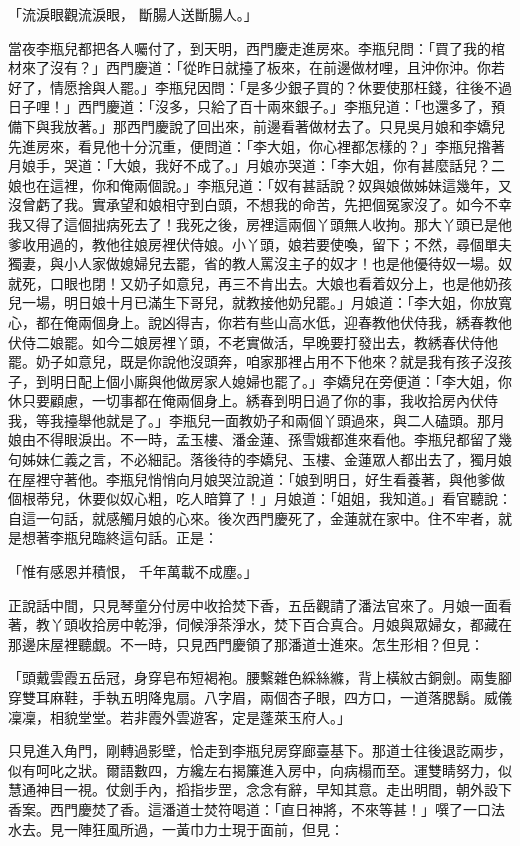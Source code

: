 \begin{showcontents}{}
「流淚眼觀流淚眼，  斷腸人送斷腸人。」

當夜李瓶兒都把各人囑付了，到天明，西門慶走進房來。李瓶兒問：「買了我的棺材來了沒有？」西門慶道：「從昨日就擡了板來，在前邊做材哩，且沖你沖。你若好了，情愿捨與人罷。」李瓶兒因問：「是多少銀子買的？休要使那枉錢，往後不過日子哩！」西門慶道：「沒多，只給了百十兩來銀子。」李瓶兒道：「也還多了，預備下與我放著。」那西門慶說了回出來，前邊看著做材去了。只見吳月娘和李嬌兒先進房來，看見他十分沉重，便問道：「李大姐，你心裡都怎樣的？」李瓶兒揝著月娘手，哭道：「大娘，我好不成了。」月娘亦哭道：「李大姐，你有甚麼話兒？二娘也在這裡，你和俺兩個說。」李瓶兒道：「奴有甚話說？奴與娘做姊妹這幾年，又沒曾虧了我。實承望和娘相守到白頭，不想我的命苦，先把個冤家沒了。如今不幸我又得了這個拙病死去了！我死之後，房裡這兩個丫頭無人收拘。那大丫頭已是他爹收用過的，教他往娘房裡伏侍娘。小丫頭，娘若要使喚，留下；不然，尋個單夫獨妻，與小人家做媳婦兒去罷，省的教人罵沒主子的奴才！也是他優待奴一場。奴就死，口眼也閉！又奶子如意兒，再三不肯出去。大娘也看着奴分上，也是他奶孩兒一場，明日娘十月已滿生下哥兒，就教接他奶兒罷。」月娘道：「李大姐，你放寬心，都在俺兩個身上。說凶得吉，你若有些山高水低，迎春教他伏侍我，綉春教他伏侍二娘罷。如今二娘房裡丫頭，不老實做活，早晚要打發出去，教綉春伏侍他罷。奶子如意兒，既是你說他沒頭奔，咱家那裡占用不下他來？就是我有孩子沒孩子，到明日配上個小廝與他做房家人媳婦也罷了。」李嬌兒在旁便道：「李大姐，你休只要顧慮，一切事都在俺兩個身上。綉春到明日過了你的事，我收拾房內伏侍我，等我擡舉他就是了。」李瓶兒一面教奶子和兩個丫頭過來，與二人磕頭。那月娘由不得眼淚出。不一時，孟玉樓、潘金蓮、孫雪娥都進來看他。李瓶兒都留了幾句姊妹仁義之言，不必細記。落後待的李嬌兒、玉樓、金蓮眾人都出去了，獨月娘在屋裡守著他。李瓶兒悄悄向月娘哭泣說道：「娘到明日，好生看養著，與他爹做個根蒂兒，休要似奴心粗，吃人暗算了！」月娘道：「姐姐，我知道。」看官聽說：自這一句話，就感觸月娘的心來。後次西門慶死了，金蓮就在家中。住不牢者，就是想著李瓶兒臨終這句話。正是：

「惟有感恩并積恨，  千年萬載不成塵。」

正說話中間，只見琴童分付房中收拾焚下香，五岳觀請了潘法官來了。月娘一面看著，教丫頭收拾房中乾淨，伺候淨茶淨水，焚下百合真合。月娘與眾婦女，都藏在那邊床屋裡聽覷。不一時，只見西門慶領了那潘道士進來。怎生形相？但見：

「頭戴雲霞五岳冠，身穿皂布短褐袍。腰繫雜色綵絲縧，背上橫紋古銅劍。兩隻腳穿雙耳麻鞋，手執五明降鬼扇。八字眉，兩個杏子眼，四方口，一道落腮鬍。威儀凜凜，相貌堂堂。若非霞外雲遊客，定是蓬萊玉府人。」

只見進入角門，剛轉過影壁，恰走到李瓶兒房穿廊臺基下。那道士往後退訖兩步，似有呵叱之狀。爾語數四，方纔左右揭簾進入房中，向病榻而至。運雙睛努力，似慧通神目一視。仗劍手內，搯指步罡，念念有辭，早知其意。走出明間，朝外設下香案。西門慶焚了香。這潘道士焚符喝道：「直日神將，不來等甚！」噀了一口法水去。見一陣狂風所過，一黃巾力士現于面前，但見：


\end{showcontents}

